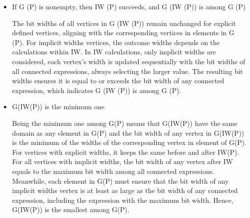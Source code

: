 \begin{itemize}
    \item If G (P) is nonempty, then IW (P) succeeds, and G (IW (P)) is among G (P)

The bit widths of all vertices in G (IW (P)) remain unchanged for explicit defined vertices, aligning with the corresponding vertices in elements in G (P). For implicit widths vertices, the outcome widths depends on the calculations within IW. In IW calculations, only implicit widths are considered, each vertex's width is updated sequentially with the bit widths of all connected expressions, always selecting the larger value. The resulting bit widths ensures it is equal to or exceeds the bit width of any connected expression, which indicates G (IW (P)) is among G (P).

    \item G(IW(P)) is the minimum one
    
Being the minimum one among G(P) means that G(IW(P)) have the same domain as any element in G(P) and the bit width of any vertex in G(IW(P)) is the minimum of the widths of the corresponding vertex in element of G(P).
For vertices with explicit widths, it keeps the same before and after IW(P). For all vertices with implicit widths, the bit width of any vertex after IW equals to the maximum bit width among all connected expressions. Meanwhile, each element in G(P) must ensure that the bit width of any implicit widths vertex is at least as large as the bit width of any connected expression, including the expression with the maximum bit width. Hence, G(IW(P)) is the smallest among G(P).
    
\end{itemize}